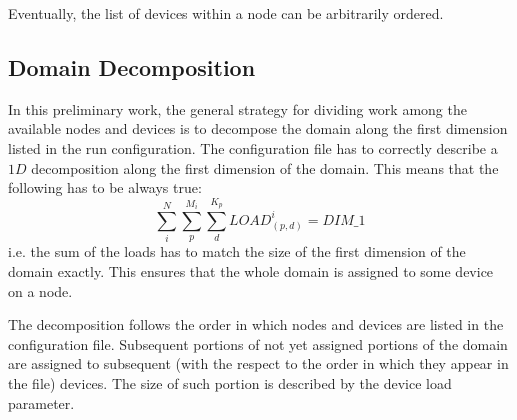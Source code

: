 Eventually, the list of devices within a node can be arbitrarily ordered.



\subsection{Domain Decomposition}
\label{sec:domain_decomposition}
In this preliminary work, the general strategy for dividing work among the available nodes and devices is to decompose the domain along the first dimension listed in the run configuration. The configuration file has to correctly describe a $1D$ decomposition along the first dimension of the domain. This means that the following has to be always true:
\[
\sum_i^N \sum_p^{M_i} \sum_d^{K_p} LOAD^i_{(p,d)} = DIM\_1
\]
i.e. the sum of the loads has to match the size of the first dimension of the domain exactly. This ensures that the whole domain is assigned to some device on a node.

The decomposition follows the order in which nodes and devices are listed in the configuration file. Subsequent portions of not yet assigned portions of the domain are assigned to subsequent (with the respect to the order in which they appear in the file) devices. The size of such portion is described by the device load parameter.

